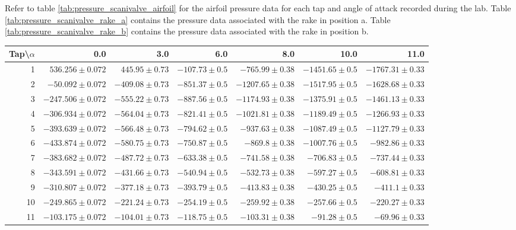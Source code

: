\documentclass[runningheads]{llncs}
\begin{document}
\noindent
Refer to table \ref{tab:pressure_scanivalve_airfoil} for the airfoil pressure data for each tap and angle of attack recorded during the lab. Table \ref{tab:pressure_scanivalve_rake_a} contains the pressure data associated with the rake in position a. Table \ref{tab:pressure_scanivalve_rake_b} contains the pressure data associated with the rake in position b.

\begin{table}
\begin{center}
\begin{tabular}{rrrrrrr}
\toprule
{}Tap\textbackslash$\alpha$ &              0.0  &              3.0  &             6.0  &               8.0  &              10.0 &    
           11.0 \\
\midrule
1  &   $536.256\pm0.072$ &   $445.95\pm0.73$ &  $-107.73\pm0.5$ &   $-765.99\pm0.38$ &  $-1451.65\pm0.5$ &  $-1767.31\pm0.33$ \\
2  &   $-50.092\pm0.072$ &  $-409.08\pm0.73$ &  $-851.37\pm0.5$ &  $-1207.65\pm0.38$ &  $-1517.95\pm0.5$ &  $-1628.68\pm0.33$ \\
3  &  $-247.506\pm0.072$ &  $-555.22\pm0.73$ &  $-887.56\pm0.5$ &  $-1174.93\pm0.38$ &  $-1375.91\pm0.5$ &  $-1461.13\pm0.33$ \\
4  &  $-306.934\pm0.072$ &  $-564.04\pm0.73$ &  $-821.41\pm0.5$ &  $-1021.81\pm0.38$ &  $-1189.49\pm0.5$ &  $-1266.93\pm0.33$ \\
5  &  $-393.639\pm0.072$ &  $-566.48\pm0.73$ &  $-794.62\pm0.5$ &   $-937.63\pm0.38$ &  $-1087.49\pm0.5$ &  $-1127.79\pm0.33$ \\
6  &  $-433.874\pm0.072$ &  $-580.75\pm0.73$ &  $-750.87\pm0.5$ &    $-869.8\pm0.38$ &  $-1007.76\pm0.5$ &   $-982.86\pm0.33$ \\
7  &  $-383.682\pm0.072$ &  $-487.72\pm0.73$ &  $-633.38\pm0.5$ &   $-741.58\pm0.38$ &   $-706.83\pm0.5$ &   $-737.44\pm0.33$ \\
8  &  $-343.591\pm0.072$ &  $-431.66\pm0.73$ &  $-540.94\pm0.5$ &   $-532.73\pm0.38$ &   $-597.27\pm0.5$ &   $-608.81\pm0.33$ \\
9  &  $-310.807\pm0.072$ &  $-377.18\pm0.73$ &  $-393.79\pm0.5$ &   $-413.83\pm0.38$ &   $-430.25\pm0.5$ &    $-411.1\pm0.33$ \\
10 &  $-249.865\pm0.072$ &  $-221.24\pm0.73$ &  $-254.19\pm0.5$ &   $-259.92\pm0.38$ &   $-257.66\pm0.5$ &   $-220.27\pm0.33$ \\
11 &  $-103.175\pm0.072$ &  $-104.01\pm0.73$ &  $-118.75\pm0.5$ &   $-103.31\pm0.38$ &    $-91.28\pm0.5$ &    $-69.96\pm0.33$ \\

\end{tabular}
\end{center}
\end{table}
\end{document}
